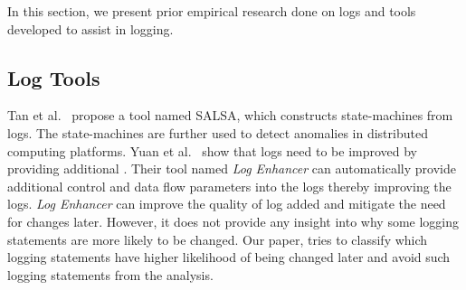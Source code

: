 
In this section, we present prior empirical research done on logs and tools developed to assist in logging.


\subsection{Log Tools}


%
%


Tan {et al}$ . $~\cite{TanSalsa} propose a tool named SALSA, which constructs state-machines from logs. The state-machines are further used to detect anomalies in distributed computing platforms. Yuan {et al$ . $}~\cite{Yuan} show that logs need to be improved by providing additional . Their tool named \emph{Log Enhancer} can automatically provide additional control and data flow parameters into the logs thereby improving the logs. \emph{Log Enhancer} can improve the quality of log added and mitigate the need for changes later. However, it does not provide any insight into why some logging statements are more likely to be changed. Our paper, tries to classify which logging statements have higher likelihood of being changed later and avoid such logging statements from the analysis. 


